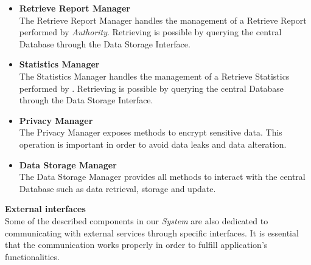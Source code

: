 \documentclass{article}
\begin{document}
\begin{itemize}
    \item \textbf{Retrieve Report Manager}\\
    The Retrieve Report Manager handles the management of a Retrieve Report performed by \textit{Authority}. Retrieving 
    is possible by querying the central Database through the Data Storage Interface.
    \item \textbf{Statistics Manager} \\
    The Statistics Manager handles the management of a Retrieve Statistics performed by . Retrieving 
    is possible by querying the central Database through the Data Storage Interface.     
    \item \textbf{Privacy Manager} \\
    The Privacy Manager exposes methods to encrypt sensitive data. This operation is important in order to avoid data leaks
    and data alteration.
    \item \textbf{Data Storage Manager} \\
    The Data Storage Manager provides all methods to interact with the central Database such as data retrieval, 
    storage and update.
    
\end{itemize}

\textbf{External interfaces} \\
Some of the described components in our \textit{System} are also dedicated to communicating with external services through 
specific interfaces. It is essential that the communication works properly in order to fulfill application's functionalities.  
\end{document}

